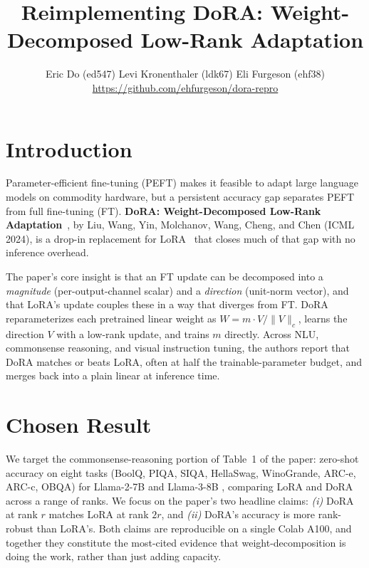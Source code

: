 \documentclass[11pt,twocolumn]{article}
\title{\vspace{-2em}Reimplementing DoRA: Weight-Decomposed Low-Rank Adaptation}
\author{Eric Do (ed547) Levi Kronenthaler (ldk67) Eli Furgeson (ehf38)\\ \url{https://github.com/ehfurgeson/dora-repro}}
\date{}
\begin{document}
\maketitle
\thispagestyle{empty}

\vspace{-1em}
\section{Introduction}
\vspace{-1em}
Parameter-efficient fine-tuning (PEFT) makes it feasible to adapt large
language models on commodity hardware, but a persistent accuracy gap
separates PEFT from full fine-tuning (FT). \textbf{DoRA: Weight-Decomposed
Low-Rank Adaptation}~\cite{liu2024dora}, by Liu, Wang, Yin, Molchanov,
Wang, Cheng, and Chen (ICML 2024), is a drop-in replacement for
LoRA~\cite{hu2022lora} that closes much of that gap with no inference
overhead.

The paper's core insight is that an FT update can be decomposed into a
\emph{magnitude} (per-output-channel scalar) and a \emph{direction}
(unit-norm vector), and that LoRA's update couples these in a way that
diverges from FT. DoRA reparameterizes each pretrained linear weight as
$W = m \cdot V/\|V\|_c$, learns the direction $V$ with a low-rank update,
and trains $m$ directly. Across NLU, commonsense reasoning, and visual
instruction tuning, the authors report that DoRA matches or beats LoRA,
often at half the trainable-parameter budget, and merges back into a
plain linear at inference time.
\vspace{-1em}
\section{Chosen Result}
\vspace{-1em}
We target the commonsense-reasoning portion of Table~1 of the paper:
zero-shot accuracy on eight tasks (BoolQ, PIQA, SIQA, HellaSwag,
WinoGrande, ARC-e, ARC-c, OBQA) for Llama-2-7B \cite{touvron2023llama2} and Llama-3-8B \cite{llama3}, comparing
LoRA and DoRA across a range of ranks. We focus on the paper's two
headline claims: \emph{(i)} DoRA at rank $r$ matches LoRA at rank $2r$,
and \emph{(ii)} DoRA's accuracy is more rank-robust than LoRA's. Both
claims are reproducible on a single Colab A100, and together they
constitute the most-cited evidence that weight-decomposition is doing
the work, rather than just adding capacity.

\vspace{-1em}
\end{document}

